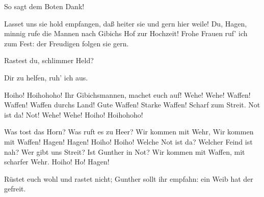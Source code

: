 \begin{drama}
\Siegfriedspeaks

So sagt dem Boten Dank!
 

\Gutrunespeaks

Lasset uns sie hold empfangen,
daß heiter sie und gern hier weile!
Du, Hagen, minnig rufe die Mannen
nach Gibichs Hof zur Hochzeit!
Frohe Frauen ruf' ich zum Fest:
der Freudigen folgen sie gern.
 



Rastest du, schlimmer Held?
 

\Siegfriedspeaks

Dir zu helfen, ruh' ich aus.
 





\scene

\Hagenspeaks


Hoiho! Hoihohoho!
Ihr Gibichsmannen, machet euch auf!
Wehe! Wehe! Waffen! Waffen!
Waffen durchs Land! Gute Waffen!
Starke Waffen! Scharf zum Streit.
Not ist da! Not! Wehe! Wehe!
Hoiho! Hoihohoho!
 






Was tost das Horn?
Was ruft es zu Heer?
Wir kommen mit Wehr,
Wir kommen mit Waffen!
Hagen! Hagen!
Hoiho! Hoiho!
Welche Not ist da?
Welcher Feind ist nah?
Wer gibt uns Streit?
Ist Gunther in Not?
Wir kommen mit Waffen,
mit scharfer Wehr.
Hoiho! Ho! Hagen!
 

\Hagenspeaks



Rüstet euch wohl und rastet nicht;
Gunther sollt ihr empfahn:
ein Weib hat der gefreit.
 


\end{drama}
